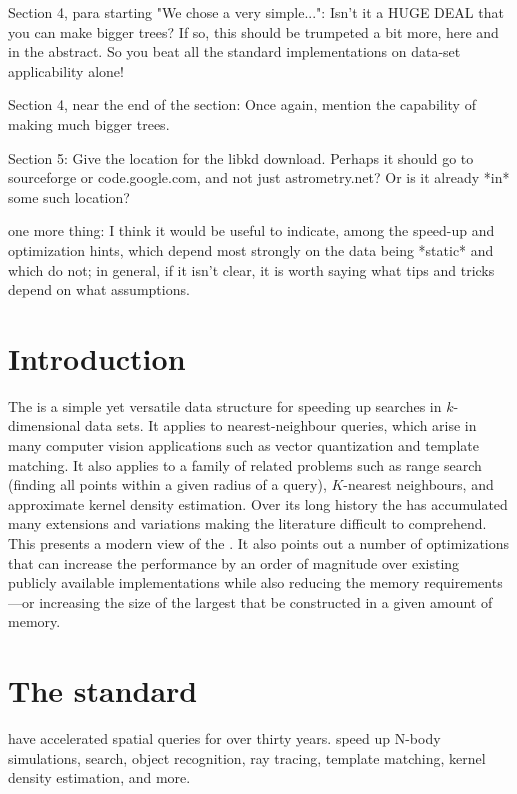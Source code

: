 {Section 4, para starting "We chose a very simple...": Isn't it a HUGE
DEAL that you can make bigger trees?  If so, this should be trumpeted
a bit more, here and in the abstract.  So you beat all the standard
implementations on data-set applicability alone!

Section 4, near the end of the section:  Once again, mention the
capability of making much bigger trees.

Section 5:  Give the location for the libkd download.  Perhaps it
should go to sourceforge or code.google.com, and not just
astrometry.net?  Or is it already *in* some such location?

one more thing:  I think it would be useful to indicate, among the
speed-up and optimization hints, which depend most strongly on the
data being *static* and which do not; in general, if it isn't clear,
it is worth saying what tips and tricks depend on what assumptions.
}




\section{Introduction}

  The \kdtree is a simple yet versatile data structure for speeding up
  searches in $k$-dimensional data sets.  It applies to
  nearest-neighbour queries, which arise in many computer vision
  applications such as vector quantization and template matching.  It
  also applies to a family of related problems such as range search
  (finding all points within a given radius of a query), $K$-nearest
  neighbours, and approximate kernel density estimation.  Over its
  long history the \kdtree has accumulated many extensions and
  variations making the literature difficult to comprehend.
  This \doctype presents a modern view of the \kdtree.  It also points
  out a number of optimizations that can increase the performance by
  an order of magnitude over existing publicly available
  implementations while also reducing the memory requirements---or
  increasing the size of the largest \kdtree that be constructed in a given
  amount of memory.

\section{The standard \kdtree}


\Kdtrees have accelerated spatial queries for over thirty years.
\Kdtrees speed up N-body simulations, search, object recognition,
ray tracing, template matching, kernel density estimation, and more.



